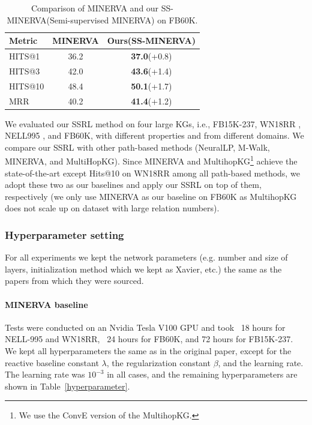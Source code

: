 \documentclass[lettersize,journal]{IEEEtran}
\begin{document}
\begin{table}
\caption{Comparison of MINERVA and our SS-MINERVA(Semi-supervised MINERVA) on FB60K.}
\centering
\begin{tabular}{lcc}
\hline
 Metric&  MINERVA & Ours(SS-MINERVA) \\
 \hline
 HITS@1&36.2&\textbf{37.0}(+0.8)\\
 HITS@3 &42.0&\textbf{43.6}(+1.4)\\
 HITS@10 &48.4&\textbf{50.1}(+1.7)\\
 MRR &40.2&\textbf{41.4}(+1.2)\\
\hline
\end{tabular}

\label{performance compfb60k}
\end{table}

We evaluated our SSRL method on four large KGs, i.e., FB15K-237, WN18RR \cite{NIPS2013_1cecc7a7}, NELL995 \cite{wenhan_emnlp2017}, and FB60K, with different properties and from different domains. We compare our SSRL with other path-based methods (NeuralLP, M-Walk, MINERVA, and MultiHopKG). Since MINERVA and MultihopKG\footnote{We use the ConvE version of the MultihopKG.} achieve the state-of-the-art except Hits@10 on WN18RR among all path-based methods, we adopt these two as our baselines and apply our SSRL on top of them, respectively (we only use MINERVA as our baseline on FB60K as MultihopKG does not scale up on dataset with large relation numbers). 

\subsubsection{Hyperparameter setting}
For all experiments we kept the network parameters (e.g. number and size of layers, initialization method which we kept as Xavier, etc.) the same as the papers from which they were sourced.

\paragraph{MINERVA baseline}
Tests were conducted on an Nvidia Tesla V100 GPU and took ~18 hours for NELL-995 and WN18RR, ~24 hours for FB60K, and 72 hours for FB15K-237. We kept all hyperparameters the same as in the original paper, except for the reactive baseline constant $\lambda$, the regularization constant $\beta$, and the learning rate. The learning rate was $10^{-3}$ in all cases, and the remaining hyperparameters are shown in Table~\ref{hyperparameter}.
\end{document}
